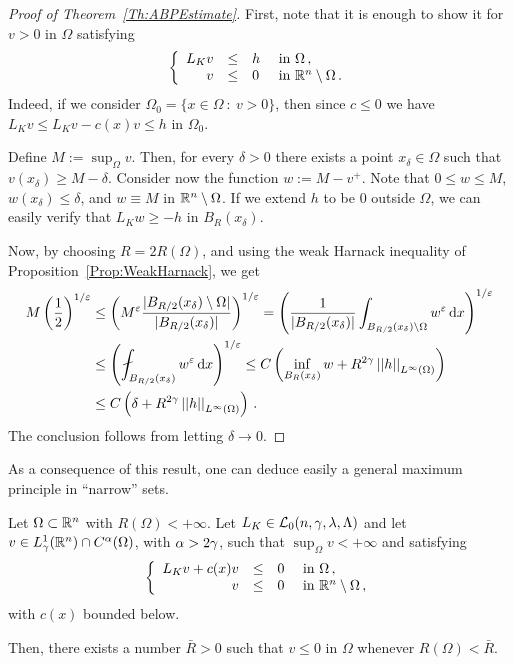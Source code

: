 \begin{proof}[Proof of Theorem~\ref{Th:ABPEstimate}]
	First, note that it is enough to show it for $v > 0$ in $\Omega$ satisfying
	$$
	\left\{\begin{array}{rcll}
	L_K v &\leq & h & \text{ in } \Omega\,, \\
	v & \leq & 0 & \text{ in } \mathbb{R}^n\setminus \Omega\,.
	\end{array} \right.
	$$
	Indeed, if we consider $\Omega_0 = \{x \in \Omega \ : \ v > 0\}$, then since $c \leq 0$ we have $L_K v \leq L_K v - c(x)v \leq h$ in $\Omega_0$.
	
	
	Define	$M:= \sup_\Omega v$. Then, for every $\delta >0$ there exists a point $x_\delta \in \Omega$ such that $v(x_\delta) \geq M - \delta$. Consider now the function $w := M - v^+$. Note that $0 \leq w \leq M$, $w(x_\delta) \leq \delta$, and $w \equiv M$ in $\mathbb{R}^n \setminus \Omega$. If we extend $h$ to be $0$ outside $\Omega$, we can easily verify that $L_K w \geq -h$ in $B_R(x_\delta)$.
	
	Now, by choosing $R= 2R(\Omega)$, and using the weak Harnack inequality of Proposition~\ref{Prop:WeakHarnack}, we get
	\begin{align*}
	M \left (\dfrac{1}{2}\right)^{1/\varepsilon} & \leq \bpar{M^{\varepsilon}\dfrac{|B_{R/2}(x_\delta)\setminus \Omega|}{|B_{R/2}(x_\delta)|}}^{1/\varepsilon}= \bpar{\dfrac{1}{|B_{R/2}(x_\delta)|} \int_{B_{R/2}(x_\delta)\setminus \Omega} w^\varepsilon \d x}^{1/\varepsilon} \\
	& \leq \bpar{ \fint_{B_{R/2}(x_\delta)} w^\varepsilon \d x}^{1/\varepsilon} \leq C \bpar{\inf_{B_{R}(x_\delta)} w + R^{2\s} \norm{h}_{L^{\infty}(\Omega)} } \\
	& \leq C \bpar{\delta + R^{2\s} \norm{h}_{L^{\infty}(\Omega)} }\,.
	\end{align*}
	The conclusion follows from letting $\delta \to 0$.
\end{proof}

As a consequence of this result, one can deduce easily a general maximum principle in ``narrow'' sets.

\begin{corollary}
	\label{Cor:MaxPpleNarrowDomains}
	Let $\Omega \subset \mathbb{R}^n$ with $R(\Omega) < +\infty$. Let $L_K \in \mathcal{L}_0(n,\gamma,\lambda, \Lambda)$ and let $v\in L^1_\gamma(\mathbb{R}^n)\cap C^{\alpha}(\Omega)$, with $\alpha > 2\gamma$, such that $\sup_{\Omega} v < +\infty$ and satisfying
	$$
	\left\{\begin{array}{rcll}
	L_K v + c(x)v &\leq & 0 & \text{ in } \Omega\,, \\
	v & \leq & 0 & \text{ in } \mathbb{R}^n\setminus \Omega\,,
	\end{array} \right.
	$$
	with $c(x)$ bounded below.
	
	Then, there exists a number $\bar{R} > 0$ such that $v \leq 0$ in $\Omega$ whenever $R(\Omega)< \bar{R}$.	
\end{corollary}


